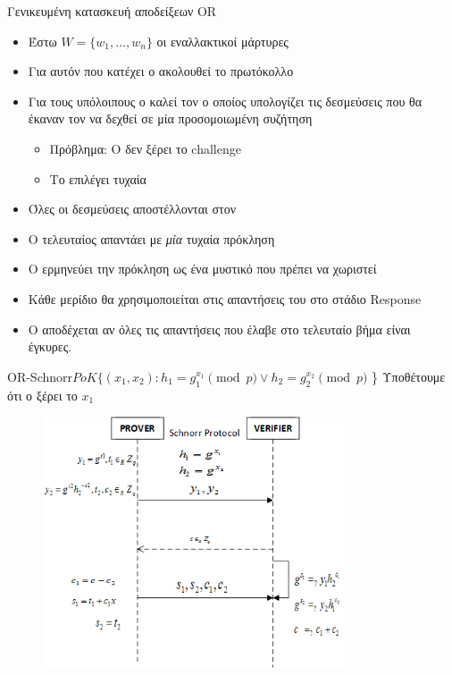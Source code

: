 \documentclass[handout]{beamer}
\begin{document}
\begin{frame}{Γενικευμένη κατασκευή αποδείξεων OR}
\begin{itemize}
	\item Έστω $W = \{w_1, ..., w_n\}$ οι εναλλακτικοί μάρτυρες
	\pause
	\item Για αυτόν που κατέχει ο \prv ακολουθεί το πρωτόκολλο
	\pause
	\item Για τους υπόλοιπους ο \prv καλεί τον \siml ο οποίος υπολογίζει τις δεσμεύσεις που θα έκαναν τον \ver να δεχθεί σε μία προσομοιωμένη συζήτηση
	\pause
	\begin{itemize}
		\item \alert{Πρόβλημα:} O \siml δεν ξέρει το challenge
		\item {} Το επιλέγει τυχαία
	\end{itemize} 
	\item Όλες οι δεσμεύσεις αποστέλλονται στον \ver 
	\pause
	\item Ο τελευταίος απαντάει με \emph{μία} τυχαία πρόκληση
	\pause
	\item O \prv ερμηνεύει την πρόκληση ως ένα μυστικό που πρέπει να χωριστεί
	\pause
	\item Κάθε μερίδιο θα χρησιμοποιείται στις απαντήσεις του \prv στο στάδιο Response
	\pause
	\item Ο \ver αποδέχεται αν όλες τις απαντήσεις που έλαβε στο τελευταίο βήμα είναι έγκυρες.
\end{itemize}
\end{frame}

\begin{frame}{OR-Schnorr}{$PoK \{(x_1,x_2): h_1 = g_1^{x_1} \pmod{p} \vee h_2 = g_2^{x_2} \pmod{p}$ \} }
Υποθέτουμε ότι ο \prv ξέρει το $x_1$
\begin{figure}
	\centering
	\includegraphics[width=0.8\textwidth]{schnorrwid.png}
\end{figure}
\end{frame}
\end{document}
